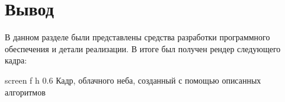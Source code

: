 \section{Вывод}

В данном разделе были представлены средства разработки программного обеспечения и детали реализации. В итоге был получен рендер следующего кадра:

{screen} %
{f} %
{h} %
{0.6\textwidth} %
{Кадр, облачного неба, созданный с помощью описанных алгоритмов} %

